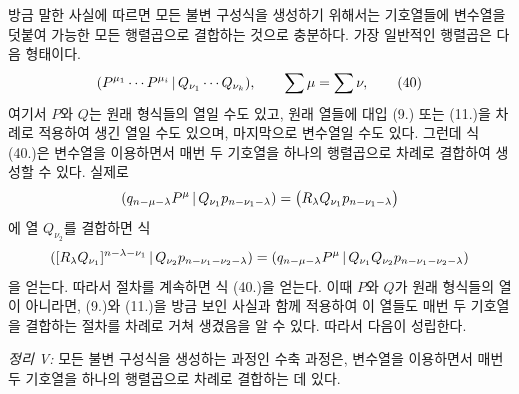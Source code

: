 방금 말한 사실에 따르면 모든 불변 구성식을 생성하기 위해서는 기호열들에 변수열을 덧붙여 가능한 모든 행렬곱으로 결합하는 것으로 충분하다. 가장 일반적인 행렬곱은 다음 형태이다.
\begin{equation}
 (P^{\mu_1}\cdots P^{\mu_i}\,|\,Q_{\nu_1}\cdots Q_{\nu_k}),\qquad \sum\mu=\sum\nu,
\tag{40}
\end{equation}
여기서 $P$와 $Q$는 원래 형식들의 열일 수도 있고, 원래 열들에 대입 (9.) 또는 (11.)을 차례로 적용하여 생긴 열일 수도 있으며, 마지막으로 변수열일 수도 있다. 그런데 식 (40.)은 변수열을 이용하면서 매번 두 기호열을 하나의 행렬곱으로 차례로 결합하여 생성할 수 있다. 실제로
\[
 (q_{n-\mu-\lambda}P^\mu\,|\,Q_{\nu_1}p_{n-\nu_1-\lambda})
 =\bigl(R_\lambda Q_{\nu_1}p_{n-\nu_1-\lambda}\bigr)
\]
에 열 $Q_{\nu_2}$를 결합하면 식
\[
 ([R_\lambda Q_{\nu_1}]^{n-\lambda-\nu_1}\,|\,Q_{\nu_2}p_{n-\nu_1-\nu_2-\lambda})
 =(q_{n-\mu-\lambda}P^\mu\,|\,Q_{\nu_1}Q_{\nu_2}p_{n-\nu_1-\nu_2-\lambda})
\]
을 얻는다. 따라서 절차를 계속하면 식 (40.)을 얻는다. 이때 $P$와 $Q$가 원래 형식들의 열이 아니라면, (9.)와 (11.)을 방금 보인 사실과 함께 적용하여 이 열들도 매번 두 기호열을 결합하는 절차를 차례로 거쳐 생겼음을 알 수 있다. 따라서 다음이 성립한다.

\emph{정리 V:} 모든 불변 구성식을 생성하는 과정인 수축 과정은, 변수열을 이용하면서 매번 두 기호열을 하나의 행렬곱으로 차례로 결합하는 데 있다.

